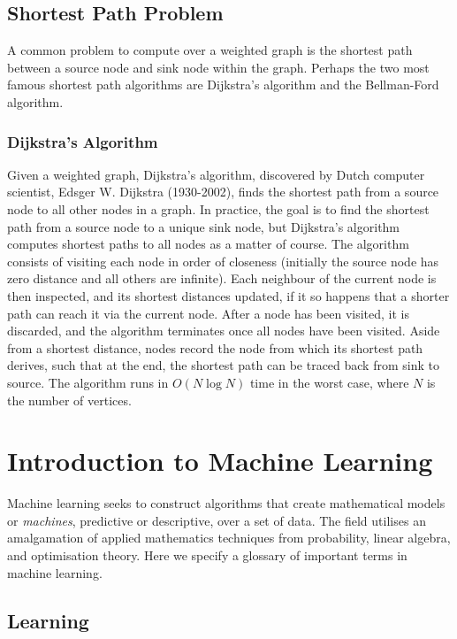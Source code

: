\documentclass[11pt]{amsart}
\begin{document}
\subsection{Shortest Path Problem}

A common problem to compute over a weighted graph is the shortest path between a source node and sink node within the graph. Perhaps the two most famous shortest path algorithms are Dijkstra's algorithm and the Bellman-Ford algorithm.

\subsubsection{Dijkstra's Algorithm}

Given a weighted graph, Dijkstra's algorithm, discovered by Dutch computer scientist,  Edsger W. Dijkstra (1930-2002), finds the shortest path from a source node to all other nodes in a graph. In practice, the goal is to find the shortest path from a source node to a unique sink node, but Dijkstra's algorithm computes shortest paths to all nodes as a matter of course. The algorithm consists of visiting each node in order of closeness (initially the source node has zero distance and all others are infinite). Each neighbour of the current node is then inspected, and its shortest distances updated, if it so happens that a shorter path can reach it via the current node. After a node has been visited, it is discarded, and the algorithm terminates once all nodes have been visited. Aside from a shortest distance, nodes record the node from which its shortest path derives, such that at the end, the shortest path can be traced back from sink to source. The algorithm runs in $O(N\log N)$ time in the worst case, where $N$ is the number of vertices.

\section{Introduction to Machine Learning}

Machine learning seeks to construct algorithms that create mathematical models or \emph{machines}, predictive or descriptive, over a set of data. The field utilises an amalgamation of applied mathematics techniques from probability, linear algebra, and optimisation theory. Here we specify a glossary of important terms in machine learning.

\subsection{Learning}
\end{document}
